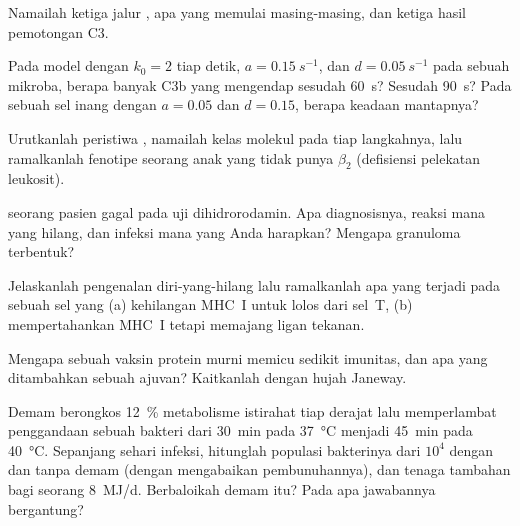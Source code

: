 \begin{exercise}[$\star$]\label{exo:b3:innate-immunity:4}
Namailah ketiga jalur , apa yang memulai masing-masing, dan ketiga
hasil pemotongan C3.
\end{exercise}

\begin{exercise}[$\star\star$]\label{exo:b3:innate-immunity:5}
Pada model  dengan $k_{0} = 2$ tiap detik, $a =
\qty{0.15}{s^{-1}}$, dan $d = \qty{0.05}{s^{-1}}$ pada sebuah mikroba, berapa
banyak C3b yang mengendap sesudah \qty{60}{s}? Sesudah \qty{90}{s}? Pada sebuah
sel inang dengan $a = 0.05$ dan $d = 0.15$, berapa keadaan mantapnya?
\end{exercise}

\begin{exercise}[$\star\star$]\label{exo:b3:innate-immunity:6}
Urutkanlah peristiwa , namailah kelas molekul pada tiap
langkahnya, lalu ramalkanlah fenotipe seorang anak yang  tidak punya
 $\beta_{2}$ (defisiensi pelekatan leukosit).
\end{exercise}

\begin{exercise}[$\star\star$]\label{exo:b3:innate-immunity:7}
 seorang pasien gagal pada uji dihidrorodamin. Apa
diagnosisnya, reaksi mana yang hilang, dan infeksi mana yang Anda
harapkan? Mengapa granuloma terbentuk?
\end{exercise}

\begin{exercise}[$\star\star$]\label{exo:b3:innate-immunity:8}
Jelaskanlah pengenalan diri-yang-hilang lalu ramalkanlah apa yang terjadi pada
sebuah sel  yang (a) kehilangan MHC~I untuk lolos dari sel~T, (b)
mempertahankan MHC~I tetapi memajang ligan tekanan.
\end{exercise}

\begin{exercise}[$\star\star$]\label{exo:b3:innate-immunity:9}
Mengapa sebuah vaksin protein murni memicu sedikit imunitas, dan apa yang
ditambahkan sebuah ajuvan? Kaitkanlah dengan hujah Janeway.
\end{exercise}

\begin{exercise}[$\star\star\star$]\label{exo:b3:innate-immunity:10}
Demam berongkos \qty{12}{\%} metabolisme istirahat tiap derajat lalu
memperlambat penggandaan sebuah bakteri dari \qty{30}{min} pada \qty{37}{\celsius}
menjadi \qty{45}{min} pada \qty{40}{\celsius}. Sepanjang sehari infeksi,
hitunglah populasi bakterinya dari $10^{4}$ dengan dan tanpa demam
(dengan mengabaikan pembunuhannya), dan tenaga tambahan bagi seorang \qty{8}{MJ/d}.
Berbaloikah demam itu? Pada apa jawabannya bergantung?
\end{exercise}

